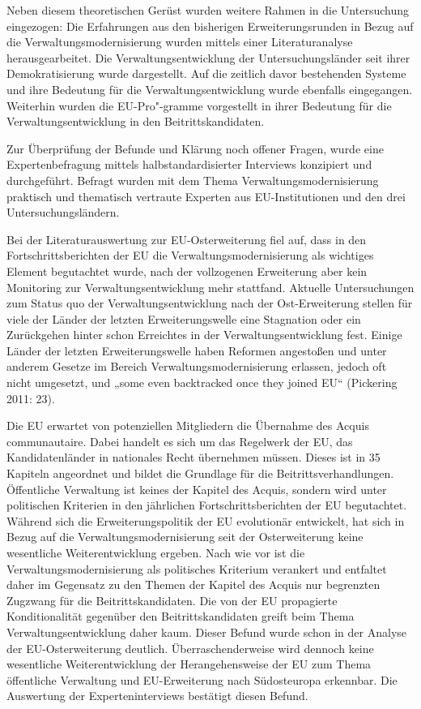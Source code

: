 Neben diesem theoretischen Gerüst wurden weitere Rahmen in die Untersuchung eingezogen: Die Erfahrungen aus den bisherigen Erweiterungsrunden in Bezug auf die Verwaltungsmodernisierung wurden mittels einer Literaturanalyse herausgearbeitet. Die Verwaltungsentwicklung der Untersuchungsländer seit ihrer Demokratisierung wurde dargestellt. Auf die zeitlich davor bestehenden Systeme und ihre Bedeutung für die Verwaltungsentwicklung wurde ebenfalls eingegangen. Weiterhin wurden die EU-Pro"-gramme vorgestellt in ihrer Bedeutung für die Verwaltungsentwicklung in den Beitrittskandidaten.\par
Zur Überprüfung der Befunde und Klärung noch offener Fragen, wurde eine Expertenbefragung mittels halbstandardisierter Interviews konzipiert und durchgeführt. Befragt wurden mit dem Thema Verwaltungsmodernisierung praktisch und thematisch vertraute Experten aus EU-Institutionen und den drei Untersuchungsländern.\par
Bei der Literaturauswertung zur EU-Osterweiterung fiel auf, dass in den Fortschrittsberichten der EU die Verwaltungsmodernisierung als wichtiges Element begutachtet wurde, nach der vollzogenen Erweiterung aber kein Monitoring zur Verwaltungsentwicklung mehr stattfand.
Aktuelle Untersuchungen zum Status quo der Verwaltungsentwicklung nach der Ost-Erweiterung stellen für viele der Länder der letzten Erweiterungswelle eine Stagnation oder ein Zurückgehen hinter schon Erreichtes in der Verwaltungsentwicklung fest. Einige Länder der letzten Erweiterungswelle haben Reformen angestoßen und unter anderem Gesetze im Bereich Verwaltungsmodernisierung erlassen, jedoch oft nicht umgesetzt, und „some even backtracked once they joined EU“ (Pickering 2011: 23).\par
Die EU erwartet von potenziellen Mitgliedern die Übernahme des Acquis communautaire. Dabei handelt es sich um das Regelwerk der EU, das Kandidatenländer in nationales Recht übernehmen müssen. Dieses ist in 35 Kapiteln angeordnet und bildet die Grundlage für die Beitrittsverhandlungen. Öffentliche Verwaltung ist keines der Kapitel des Acquis, sondern wird unter politischen Kriterien in den jährlichen Fortschrittsberichten der EU begutachtet. Während sich die Erweiterungspolitik der EU evolutionär entwickelt, hat sich in Bezug auf die Verwaltungsmodernisierung seit der Osterweiterung keine wesentliche Weiterentwicklung ergeben. Nach wie vor ist die Verwaltungsmodernisierung als politisches Kriterium verankert und entfaltet daher im Gegensatz zu den Themen der Kapitel des Acquis nur begrenzten Zugzwang für die Beitrittskandidaten. Die von der EU propagierte Konditionalität gegenüber den Beitrittskandidaten greift beim Thema Verwaltungsentwicklung daher kaum. Dieser Befund wurde schon in der Analyse der EU-Osterweiterung deutlich. Überraschenderweise wird dennoch keine wesentliche Weiterentwicklung der Herangehensweise der EU zum Thema öffentliche Verwaltung und EU-Erweiterung nach Südosteuropa erkennbar. Die Auswertung der Experteninterviews bestätigt diesen Befund.\par
